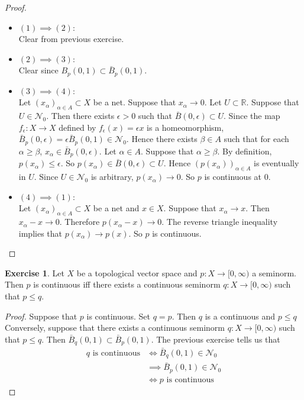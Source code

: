 \documentclass[12pt]{amsart}
\theoremstyle{definition}
\newtheorem{ex}[definition]{Exercise}
\newcommand{\al}{\alpha}
\newcommand{\ep}{\epsilon}
\newcommand{\R}{\mathbb{R}}
\newcommand{\MN}{\mathcal{N}}
\newcommand{\Rg}{[0,\infty)}
\begin{document}
	\begin{proof}\
		\begin{itemize}
			\item $(1) \implies (2)$: \\
			Clear from previous exercise. \\
			\item $(2) \implies (3)$: \\
			Clear since $B_p(0,1) \subset \bar{B}_p(0,1)$. \\
			\item $(3) \implies (4)$: \\
			Let $(x_{\al})_{\al \in A} \subset X$ be a net. Suppose that $x_{\al} \rightarrow 0$. Let $U \subset \R$. Suppose that $U \in \MN_0$. Then there exists $\ep > 0$ such that $\bar{B}(0, \ep) \subset U$. Since the map $f_{\ep}: X \rightarrow X$ defined by $f_{\ep}(x) = \ep x$ is a homeomorphism, $\bar{B}_p(0,\ep) = \ep \bar{B}_p(0,1) \in \MN_0$. Hence there exists $\beta \in A$ such that for each $\al \geq \beta$, $x_{\al} \in \bar{B}_p(0, \ep)$. Let $\al \in A$. Suppose that $\al \geq \beta$. By definition, $p(x_{\al}) \leq \ep$. So $p(x_{\al}) \in \bar{B}(0,\ep) \subset U$. Hence $(p(x_{\al}))_{\al \in A}$ is eventually in $U$. Since $U \in \MN_0$ is arbitrary, $p(x_{\al}) \rightarrow 0$. So $p$ is continuous at $0$. \\
			\item $(4) \implies (1)$: \\
			Let $(x_{\al})_{\al \in A} \subset X$ be a net and $x \in X$. Suppose that $x_{\al} \rightarrow x$. Then $x_{\al} - x \rightarrow 0$. Therefore $p(x_{\al} - x) \rightarrow 0$. The reverse triangle inequality implies that $p(x_{\al}) \rightarrow p(x)$. So $p$ is continuous.
		\end{itemize}
	\end{proof}

	\begin{ex}
		Let $X$ be a topological vector space and $p:X \rightarrow \Rg$ a seminorm. Then $p$ is continuous iff there exists a continuous seminorm $q: X \rightarrow \Rg$ such that $p \leq q$. 
	\end{ex}

	\begin{proof}
		Suppose that $p$ is continuous. Set $q = p$. Then $q$ is a continuous and $p \leq q$\\
		Conversely, suppose that there exists a continuous seminorm $q:X \rightarrow \Rg$ such that $p \leq q$. Then $\bar{B}_q(0,1) \subset \bar{B}_p(0,1)$. The previous exercise tells us that 
		\begin{align*}
			q \text{ is continuous} 
			& \iff \bar{B}_q(0,1) \in \MN_0 \\
			& \implies \bar{B}_p(0,1) \in \MN_0 \\
			& \iff p \text{ is continuous} 
		\end{align*}
	\end{proof}
\end{document}
